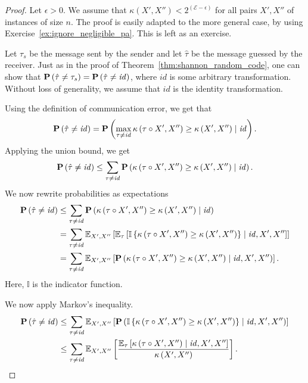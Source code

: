 \begin{proof}
Let $\epsilon > 0$. We assume that $\kappa\left(X', X''\right) < 2^{(\mathcal{E} - \epsilon)}$ for all pairs $X', X''$ of instances of size $n$. The proof is easily adapted to the more general case, by using Exercise~\ref{ex:ignore_negligible_pa}. This is left as an exercise.

Let $\tau_s$ be the message sent by the sender and let $\hat{\tau}$ be the message guessed by the receiver. Just as in the proof of Theorem~\ref{thm:shannon_random_code}, one can show that $\mathbf{P}\left(\hat{\tau} \neq \tau_s\right) = \mathbf{P}\left(\hat{\tau} \neq \mathit{id}\right)$, where $\mathit{id}$ is some arbitrary transformation. Without loss of generality, we assume that $\mathit{id}$ is the identity transformation.

Using the definition of communication error, we get that
%
$$\mathbf{P}\left(\hat{\tau} \neq \mathit{id}\right) = \mathbf{P}\left(\max_{\tau \neq \mathit{id}} \kappa\left(\tau\circ X', X''\right) \geq \kappa\left(X', X''\right) \mid \mathit{id}\right).$$
%
Applying the union bound, we get
%
$$\mathbf{P}\left(\hat{\tau} \neq \mathit{id}\right) \leq \sum_{\tau \neq \mathit{id}}\mathbf{P}\left(\kappa\left(\tau\circ X', X''\right) \geq \kappa\left(X', X''\right) \mid \mathit{id}\right).$$
%
We now rewrite probabilities as expectations
%
\begin{align*}
\mathbf{P}\left(\hat{\tau} \neq \mathit{id}\right) &\leq \sum_{\tau \neq \mathit{id}}\mathbf{P}\left(\kappa\left(\tau\circ X', X''\right) \geq \kappa\left(X', X''\right) \mid \mathit{id}\right)\\
&= \sum_{\tau \neq \mathit{id}}\mathbb{E}_{X', X''}\left[\mathbb{E}_{\tau}\left[\mathbb{I}\left\{\kappa\left(\tau\circ X', X''\right) \geq \kappa\left(X', X''\right)\right\} \mid \mathit{id}, X', X''\right]\right]\\
&= \sum_{\tau \neq \mathit{id}}\mathbb{E}_{X', X''}\left[\mathbf{P}\left(\kappa\left(\tau\circ X', X''\right) \geq \kappa\left(X', X''\right) \mid \mathit{id}, X', X''\right)\right].
\end{align*}
%
Here, $\mathbb{I}$ is the indicator function.

We now apply Markov's inequality.
%
\begin{align*}
\mathbf{P}\left(\hat{\tau} \neq \mathit{id}\right) &\leq \sum_{\tau \neq \mathit{id}}\mathbb{E}_{X', X''}\left[\mathbf{P}\left(\mathbb{I}\left\{\kappa\left(\tau\circ X', X''\right) \geq \kappa\left(X', X''\right)\right\} \mid \mathit{id}, X', X''\right)\right]\\
&\leq \sum_{\tau \neq \mathit{id}}\mathbb{E}_{X', X''}\left[\frac{\mathbb{E}_\tau\left[\kappa\left(\tau \circ X', X''\right) \mid \mathit{id}, X', X'' \right]}{\kappa\left(X', X''\right)}\right].
\end{align*}
%


\end{proof}
